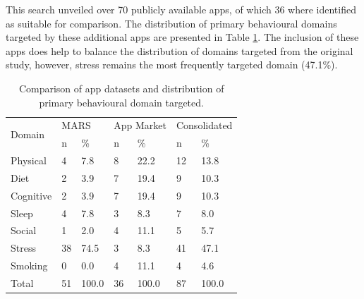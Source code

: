This search unveiled over 70 publicly available apps, of which 36 where identified as suitable for comparison. The distribution of primary behavioural domains targeted by these additional apps are presented in Table \ref{tbl: app-dataset-frequencies}. The inclusion of these apps does help to balance the distribution of domains targeted from the original study, however, stress remains the most frequently targeted domain (47.1\%).

\begin{table}[h]
\centering
\caption{Comparison of app datasets and distribution of primary behavioural domain targeted.}
\label{tbl: app-dataset-frequencies}
\begin{tabular}{@{}lllllll@{}}
\toprule
\multirow{2}{*}{Domain} & \multicolumn{2}{l}{MARS} & \multicolumn{2}{l}{App Market} & \multicolumn{2}{l}{Consolidated} \\ \cmidrule(l){2-7}
                        & n        & \%            & n           & \%               & n          & \%              \\ \midrule
Physical                & 4        & 7.8         & 8           & 22.2           & 12         & 13.8          \\
Diet                    & 2        & 3.9         & 7           & 19.4           & 9          & 10.3          \\
Cognitive               & 2        & 3.9         & 7           & 19.4           & 9          & 10.3          \\
Sleep                   & 4        & 7.8         & 3           & 8.3            & 7          & 8.0           \\
Social                  & 1        & 2.0         & 4           & 11.1           & 5          & 5.7           \\
Stress                  & 38       & 74.5        & 3           & 8.3            & 41         & 47.1          \\
Smoking                 & 0        & 0.0         & 4           & 11.1           & 4          & 4.6           \\ \midrule
Total                   & 51       & 100.0       & 36          & 100.0          & 87         & 100.0         \\ \bottomrule
\end{tabular}
\end{table}

